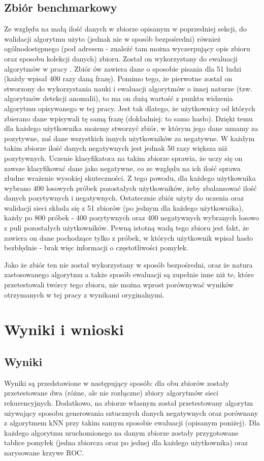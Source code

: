 \section{Zbiór benchmarkowy}
Ze względu na małą ilość danych w zbiorze opisanym w poprzedniej sekcji, do walidacji algorytmu użyto (jednak nie w sposób bezpośredni) również ogólnodostępnego (pod adresem \cite{BENCHMARK_SET_URL} - znaleźć tam można wyczerpujący opis zbioru oraz sposobu kolekcji danych) zbioru. Został on wykorzystany do ewaluacji algorytmów w pracy \cite{BENCHMARK_SET}. Zbiór ów zawiera dane o sposobie pisania dla 51 ludzi (każdy wpisał 400 razy daną frazę). Pomimo tego, że pierwotne został on stworzony do wykorzystania nauki i ewaluacji algorytmów o innej naturze (tzw. algorytmów detekcji anomalii), to ma on dużą wartość z punktu widzenia algorytmu opisywanego w tej pracy. Jest tak dlatego, że użytkownicy od których zbierano dane wpisywali tę samą frazę (dokładniej: to samo hasło). Dzięki temu dla każdego użytkownika możemy stworzyć zbiór, w którym jego dane uznamy za pozytywne, zaś dane wszystkich innych użytkowników za negatywne. W każdym takim zbiorze ilość danych negatywnych jest jednak 50 razy większa niż pozytywnych. Uczenie klasyfikatora na takim zbiorze sprawia, że uczy się on zawsze klasyfikować dane jako negatywne, co ze względu na ich ilość sprawa złudne wrażenie wysokiej skuteczności. Z tego powodu, dla każdego użytkownika wybrano 400 losowych próbek pozostałych użytkowników, żeby zbalansować ilość danych pozytywnych i negatywnych. Ostatecznie zbiór użyty do uczenia oraz walidacji sieci składa się z 51 zbiorów (po jednym dla każdego użytkownika), każdy po 800 próbek - 400 pozytywnych oraz 400 negatywnych wybranych losowo z puli pozostałych użytkowników. Pewną istotną wadą tego zbioru jest fakt, że zawiera on dane pochodzące tylko z próbek, w których użytkownik wpisał hasło bezbłędnie - brak więc informacji o częstotliwości pomyłek.

Jako że zbiór ten nie został wykorzystany w sposób bezpośredni, oraz że natura zastosowanego algorytmu a także sposób ewaluacji są zupełnie inne niż te, które przetestowali twórcy tego zbioru, nie można wprost porównywać wyników otrzymanych w tej pracy z wynikami oryginalnymi.

\chapter{Wyniki i wnioski}
\section{Wyniki}
Wyniki są przedstawione w następujący sposób: dla obu zbiorów zostały przetestowane dwa  (różne, ale nie rozłączne) zbiory algorytmów sieci rekurencyjnych. Dodatkowo, na zbiorze własnym został przetestowany algorytm używający sposobu generowania sztucznych danych negatywnych oraz porównany z algorytmem kNN przy takim samym sposobie ewaluacji (opisanym poniżej). Dla każdego algorytmu uruchomionego na danym zbiorze zostały przygotowane tablice pomyłek (jedna zbiorcza oraz po jednej dla każdego użytkownika) oraz narysowane krzywe ROC.
\label{sec:results}
